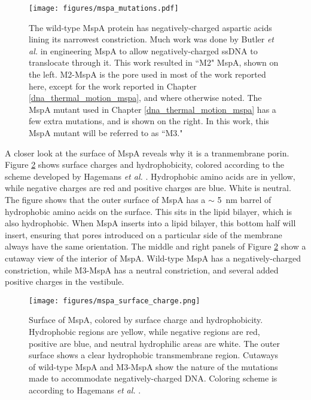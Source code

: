 \begin{figure}[h]
\begin{centering}
\texttt{[image: figures/mspa\_mutations.pdf]}
\caption[Genetic engineering of MspA]{The wild-type MspA protein has negatively-charged aspartic acids lining its narrowest constriction.  Much work was done by Butler \textit{et al.} \citep{Butler2008} in engineering MspA to allow negatively-charged ssDNA to translocate through it.  This work resulted in ``M2" MspA, shown on the left.  M2-MspA is the pore used in most of the work reported here, except for the work reported in Chapter \ref{dna_thermal_motion_mspa}, and where otherwise noted.  The MspA mutant used in Chapter \ref{dna_thermal_motion_mspa} has a few extra mutations, and is shown on the right.  In this work, this MspA mutant will be referred to as ``M3."}
\label{fig:mspa_engineering}
\end{centering}
\end{figure}

A closer look at the surface of MspA reveals why it is a tranmembrane porin.  Figure \ref{fig:mspa_engineering_charge} shows surface charges and hydrophobicity, colored according to the scheme developed by Hagemans \textit{et al.} \citep{Hagemans2015}.  Hydrophobic amino acids are in yellow, while negative charges are red and positive charges are blue.  White is neutral.  The figure shows that the outer surface of MspA has a $\sim$ \SI{5}{\nm} barrel of hydrophobic amino acids on the surface.  This sits in the lipid bilayer, which is also hydrophobic.  When MspA inserts into a lipid bilayer, this bottom half will insert, ensuring that pores introduced on a particular side of the membrane always have the same orientation.  The middle and right panels of Figure \ref{fig:mspa_engineering_charge} show a cutaway view of the interior of MspA.  Wild-type MspA has a negatively-charged constriction, while M3-MspA has a neutral constriction, and several added positive charges in the vestibule.

\begin{figure}[h]
\begin{centering}
\texttt{[image: figures/mspa\_surface\_charge.png]}
\caption[Hydrophobicity and surface charge of MspA]{Surface of MspA, colored by surface charge and hydrophobicity.  Hydrophobic regions are yellow, while negative regions are red, positive are blue, and neutral hydrophilic areas are white.  The outer surface shows a clear hydrophobic transmembrane region.  Cutaways of wild-type MspA and M3-MspA show the nature of the mutations made to accommodate negatively-charged DNA.  Coloring scheme is according to Hagemans \textit{et al.} \citep{Hagemans2015}.}
\label{fig:mspa_engineering_charge}
\end{centering}
\end{figure}

